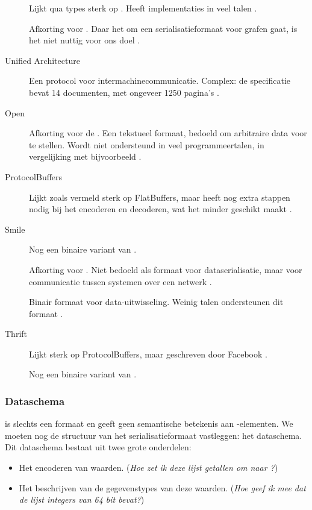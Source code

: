 \begin{description}
    Lijkt qua types sterk op .
    Heeft implementaties in veel talen \autocite{messagepack}.
    \item[\acronym{OGDL}] Afkorting voor .
    Daar het om een serialisatieformaat voor grafen gaat, is het niet nuttig voor ons doel \autocite{ogdl}.
    \item[\acronym{OPC} Unified Architecture] Een protocol voor intermachinecommunicatie.
    Complex: de specificatie bevat 14 documenten, met ongeveer 1250 pagina's \autocite{tr62541}.
    \item[Open\acronym{DLL}] Afkorting voor de .
    Een tekstueel formaat, bedoeld om arbitraire data voor te stellen.
    Wordt niet ondersteund in veel programmeertalen, in vergelijking met bijvoorbeeld  \autocite{openddl}.
    \item[ProtocolBuffers] Lijkt zoals vermeld sterk op FlatBuffers, maar heeft nog extra stappen nodig bij het encoderen en decoderen, wat het minder geschikt maakt \autocite{protobuf}.
    \item[Smile] Nog een binaire variant van  \autocite{smile}.
    \item[\acronym{SOAP}] Afkorting voor .
    Niet bedoeld als formaat voor dataserialisatie, maar voor communicatie tussen systemen over een netwerk \autocite{soap}.
    \item[\acronym{SDXF}] Binair formaat voor data-uitwisseling.
    Weinig talen ondersteunen dit formaat \autocite{rfc3072}.
    \item[Thrift] Lijkt sterk op ProtocolBuffers, maar geschreven door Facebook \autocite{slee2007}.
    \item[\acronym{UBJSON}] Nog een binaire variant van  \autocite{ubjson}.

\end{description}

\subsubsection{Dataschema}

 is slechts een formaat en geeft geen semantische betekenis aan -elementen.
We moeten nog de structuur van het serialisatieformaat vastleggen: het dataschema.
Dit dataschema bestaat uit twee grote onderdelen:

\begin{itemize}
    \item Het encoderen van waarden. (\textit{Hoe zet ik deze lijst getallen om naar ?})
    \item Het beschrijven van de gegevenstypes van deze waarden. (\textit{Hoe geef ik mee dat de lijst integers van 64 bit bevat?})
\end{itemize}

